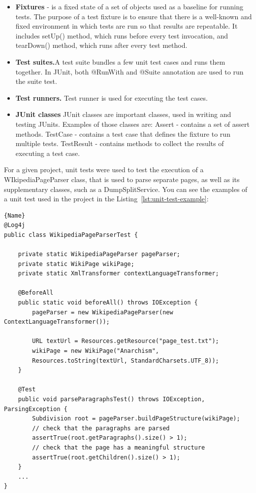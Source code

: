 \documentclass[thesis=M,english,hidelinks]{FITthesis}[2019/12/23]
\begin{document}
\begin{itemize}
	\item \textbf{Fixtures} -  is a fixed state of a set of objects used as a baseline for running tests. The purpose of a test fixture is to ensure that there is a well-known and fixed environment in which tests are run so that results are repeatable. It includes setUp() method, which runs before every test invocation, and tearDown() method, which runs after every test method.
	\item \textbf{Test suites.}A test suite bundles a few unit test cases and runs them together. In JUnit, both @RunWith and @Suite annotation are used to run the suite test. 
	\item \textbf{Test runners.} Test runner is used for executing the test cases. 
	\item \textbf{JUnit classes} JUnit classes are important classes, used in writing and testing JUnits.  Examples of those classes are:
	\subitem Assert - contains a set of assert methods.	
	\subitem TestCase - contains a test case that defines the fixture to run multiple tests.
	\subitem TestResult - contains methods to collect the results of executing a test case.
\end{itemize}

For a given project, unit tests were used to test the execution of a WIkipediaPageParser class, that is used to parse separate pages, as well as its supplementary classes, such as a DumpSplitService. You can see the examples of a unit test used in the project in the Listing\ \ref{lst:unit-test-example}:


\begin{lstlisting}[caption=JUnit Paragraph Parsing Unit Test Class,frame=tlrb,  label = {lst:unit-test-example}]{Name}
@Log4j
public class WikipediaPageParserTest {

	private static WikipediaPageParser pageParser;
	private static WikiPage wikiPage;
	private static XmlTransformer contextLanguageTransformer;
	
	@BeforeAll
	public static void beforeAll() throws IOException {
		pageParser = new WikipediaPageParser(new ContextLanguageTransformer());
		
		URL textUrl = Resources.getResource("page_test.txt");
		wikiPage = new WikiPage("Anarchism",
		Resources.toString(textUrl, StandardCharsets.UTF_8));
	}
	
	@Test
	public void parseParagraphsTest() throws IOException, ParsingException {
		Subdivision root = pageParser.buildPageStructure(wikiPage);
		// check that the paragraphs are parsed
		assertTrue(root.getParagraphs().size() > 1);
		// check that the page has a meaningful structure
		assertTrue(root.getChildren().size() > 1);
	}
	...
}
\end{lstlisting}
\end{document}
